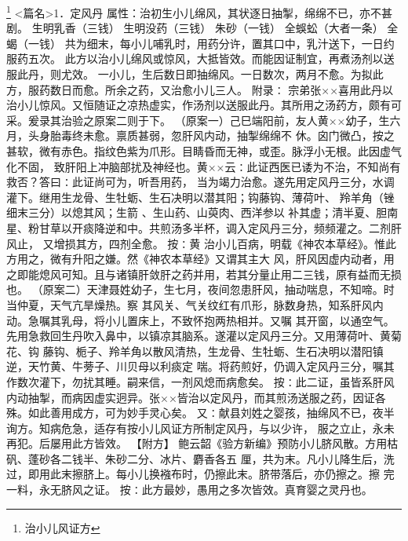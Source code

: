 \documentclass[a4paper,12pt,UTF8,twoside]{ctexbook}
\begin{document}
\footnote{治小儿风证方}
<篇名>1．定风丹
属性：治初生小儿绵风，其状逐日抽掣，绵绵不已，亦不甚剧。 
生明乳香（三钱） 生明没药（三钱） 朱砂（一钱） 全蜈蚣（大者一条） 全蝎（一钱） 
共为细末，每小儿哺乳时，用药分许，置其口中，乳汁送下，一日约服药五次。 
此方以治小儿绵风或惊风，大抵皆效。而能因证制宜，再煮汤剂以送服此丹，则尤效。 
一小儿，生后数日即抽绵风。一日数次，两月不愈。为拟此方，服药数日而愈。所余之药，又治愈小儿三人。 
附录∶ 
宗弟张××喜用此丹以治小儿惊风。又恒随证之凉热虚实，作汤剂以送服此丹。其所用之汤药方，颇有可 
采。爰录其治验之原案二则于下。 
（原案一）己巳端阳前，友人黄××幼子，生六月，头身胎毒终未愈。禀质甚弱，忽肝风内动，抽掣绵绵不 
休。囟门微凸，按之甚软，微有赤色。指纹色紫为爪形。目睛昏而无神，或歪。脉浮小无根。此因虚气化不固， 
致肝阳上冲脑部扰及神经也。黄××云∶此证西医已诿为不治，不知尚有救否？答曰∶此证尚可为，听吾用药， 
当为竭力治愈。遂先用定风丹三分，水调灌下。继用生龙骨、生牡蛎、生石决明以潜其阳；钩藤钩、薄荷叶、 
羚羊角（锉细末三分）以熄其风；生箭 、生山药、山萸肉、西洋参以 
补其虚；清半夏、胆南星、粉甘草以开痰降逆和中。共煎汤多半杯，调入定风丹三分，频频灌之。二剂肝风止， 
又增损其方，四剂全愈。 
按∶黄 治小儿百病，明载《神农本草经》。惟此方用之，微有升阳之嫌。然《神农本草经》又谓其主大 
风，肝风因虚内动者，用之即能熄风可知。且与诸镇肝敛肝之药并用，若其分量止用二三钱，原有益而无损也。 
（原案二）天津聂姓幼子，生七月，夜间忽患肝风，抽动喘息，不知啼。时当仲夏，天气亢旱燥热。察 
其风关、气关纹红有爪形，脉数身热，知系肝风内动。急嘱其乳母，将小儿置床上，不致怀抱两热相并。又嘱 
其开窗，以通空气。先用急救回生丹吹入鼻中，以镇凉其脑系。遂灌以定风丹三分。又用薄荷叶、黄菊花、钩 
藤钩、栀子、羚羊角以散风清热，生龙骨、生牡蛎、生石决明以潜阳镇逆，天竹黄、牛蒡子、川贝母以利痰定 
喘。将药煎好，仍调入定风丹三分，嘱其作数次灌下，勿扰其睡。嗣来信，一剂风熄而病愈矣。 
按∶此二证，虽皆系肝风内动抽掣，而病因虚实迥异。张××皆治以定风丹，而其煎汤送服之药，因证各 
殊。如此善用成方，可为妙手灵心矣。 
又∶献县刘姓之婴孩，抽绵风不已，夜半询方。知病危急，适存有按小儿风证方所制定风丹，与以少许， 
服之立止，永未再犯。后屡用此方皆效。 
【附方】 鲍云韶《验方新编》预防小儿脐风散。方用枯矾、蓬砂各二钱半、朱砂二分、冰片、麝香各五 
厘，共为末。凡小儿降生后，洗过，即用此末擦脐上。每小儿换襁布时，仍擦此末。脐带落后，亦仍擦之。擦 
完一料，永无脐风之证。 
按∶此方最妙，愚用之多次皆效。真育婴之灵丹也。 
\end{document}
